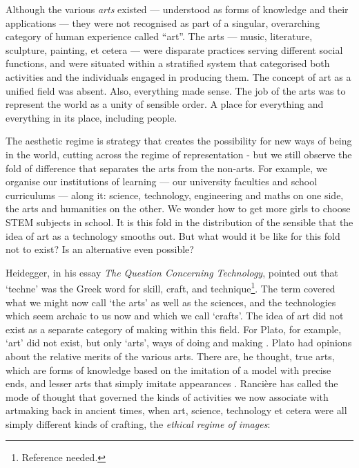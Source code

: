\documentclass[letterpaper]{article}
\begin{document}
    Although the various \emph{arts} existed — understood as forms of knowledge and their applications — they were not recognised as part of a singular, overarching category of human experience called “art”. The arts — music, literature, sculpture, painting, et cetera — were disparate practices serving different social functions, and were situated within a stratified system that categorised both activities and the individuals engaged in producing them. The concept of art as a unified field was absent. Also, everything made sense. The job of the arts was to represent the world as a unity of sensible order. A place for everything and everything in its place, including people.
    
    The aesthetic regime is strategy that creates the possibility for new ways of being in the world, cutting across the regime of representation - but we still observe the fold of difference that separates the arts from the non-arts. For example, we organise our institutions of learning — our university faculties and school curriculums — along it: science, technology, engineering and maths on one side, the arts and humanities on the other. We wonder how to get more girls to choose STEM subjects in school. It is this fold in the distribution of the sensible that the idea of art as a technology smooths out. But what would it be like for this fold not to exist? Is an alternative even possible?

    Heidegger, in his essay \emph{The Question Concerning Technology}, pointed out that ‘techne’ was the Greek word for skill, craft, and technique\footnote{Reference needed.}. The term covered what we might now call ‘the arts’ as well as the sciences, and the technologies which seem archaic to us now and which we call ‘crafts’. The idea of art did not exist as a separate category of making within this field. For Plato, for example, ‘art’ did not exist, but only ‘arts’, ways of doing and making \citep[p.20]{RancierPltcsOfThAsthtcs2004}. Plato had opinions about the relative merits of the various arts. There are, he thought, true arts, which are forms of knowledge based on the imitation of a model with precise ends, and lesser arts that simply imitate appearances \citep[p.20]{RancierPltcsOfThAsthtcs2004}.  Rancière has called the mode of thought that governed the kinds of activities we now associate with artmaking back in ancient times, when art, science, technology et cetera were all simply different kinds of crafting, the \emph{ethical regime of images}:
\end{document}
